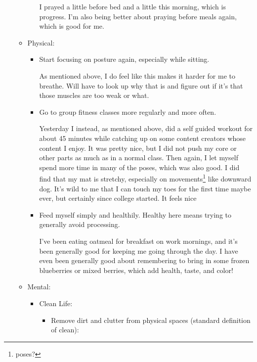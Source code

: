 \documentclass[12pt]{article}[titlepage]
\renewcommand{\,}{\textsuperscript{,}}
\begin{document}
\begin{itemize}
\begin{itemize}
\begin{itemize}
I prayed a little before bed and a little this morning, which is progress. I'm also being better about praying before meals again, which is good for me.  
\end{itemize}
\item Physical:   
\begin{itemize}   
\item Start focusing on posture again, especially while sitting.

As mentioned above, I do feel like this makes it harder for me to breathe. Will have to look up why that is and figure out if it's that those muscles are too weak or what.  
\item Go to group fitness classes more regularly and more often.

Yesterday I instead, as mentioned above, did a self guided workout for about 45 minutes while catching up on some content creators whose content I enjoy.  
It was pretty nice, but I did not push my core or other parts as much as in a normal class.  
Then again, I let myself spend more time in many of the poses, which was also good.  
I did find that my mat is stretchy, especially on movements\footnote{poses?} like downward dog.  
It's wild to me that I can touch my toes for the first time maybe ever, but certainly since college started. It feels nice  
\item Feed myself simply and healthily. Healthy here means trying to generally avoid processing.

I've been eating oatmeal for breakfast on work mornings, and it's been generally good for keeping me going through the day.  
I have even been generally good about remembering to bring in some frozen blueberries or mixed berries, which add health, taste, and color!  
\end{itemize}

\item Mental:   
\begin{itemize}  
\item Clean Life:   
\begin{itemize}
\item Remove dirt and clutter from physical spaces (standard definition of clean):


\end{itemize}
\end{itemize}
\end{itemize}
\end{itemize}
\end{document}
